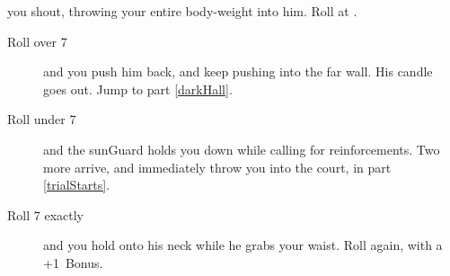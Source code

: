 you shout, throwing your entire body-weight into him.
Roll  at \tn[7].

\begin{description}
  \item[Roll over 7]
  and you push him back, and keep pushing into the far wall.
  His candle goes out.
  Jump to part \vref{darkHall}.
  \item[Roll under 7]
  and the \gls{sunGuard} holds you down while calling for reinforcements.
  Two more arrive, and immediately throw you into the \gls{court}, in part \vref{trialStarts}.
  \item[Roll 7 exactly]
  and you hold onto his neck while he grabs your waist.
  Roll again, with a +1~Bonus.
\end{description}

